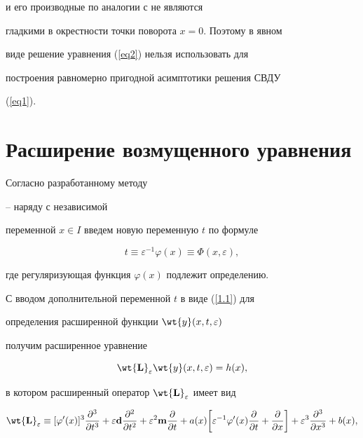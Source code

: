 и его производные по аналогии с \cite{Bobochko2} не являются


гладкими в окрестности точки поворота $ x = 0$. Поэтому в явном


виде решение уравнения (\ref{eq2}) нельзя использовать для


построения равномерно пригодной асимптотики решения СВДУ


(\ref{eq1}).








\section{Расширение возмущенного уравнения}





Согласно разработанному методу


\cite{Bobochko1}--\cite{Bobochko3} наряду с независимой


переменной $x \in I$ введем новую переменную $t$ по формуле


\begin{equation}


\label{1.1} t \equiv \varepsilon^{-1} \varphi (x) \equiv \Phi


(x, \varepsilon),


\end{equation}


где регуляризующая функция $\varphi(x)$ подлежит определению.





С вводом дополнительной переменной $t$ в виде (\ref{1.1}) для


определения расширенной функции $\wt{y} (x, t, \varepsilon)$


получим расширенное уравнение


\begin{equation}


\label{1.2} \wt{\bold L}_{\varepsilon} \wt{y} (x, t,


\varepsilon) = h(x),


\end{equation}


в котором расширенный оператор $\wt{\bold L}_{\varepsilon}$ имеет вид


\begin{equation}


\label{1.3}


\wt{\bold{L}}_{\varepsilon} \equiv [\varphi'


(x)]^3 \frac{\partial^3}{\partial t^3} + \varepsilon \bold{d}


\frac{\partial^2}{\partial t^2} + \varepsilon^{2} \bold{m}


\frac {\partial}{\partial t} + a(x) \bigg[ \varepsilon^{-1}


\varphi' (x) \frac{\partial}{\partial t} +


\frac{\partial}{\partial x} \bigg] + \varepsilon^3


\frac{\partial^3}{\partial x^3} + b(x),


\end{equation}


